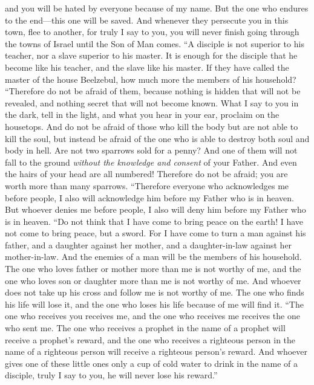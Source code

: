 \begin{biblechapter}
\verse and you will be hated by everyone because of my name. But the one who endures to the end—this one will be saved.
\verse And whenever they persecute you in this town, flee to another, for truly I say to you, you will never finish going through the towns of Israel until the Son of Man comes.
\verse “A disciple is not superior to his teacher, nor a slave superior to his master.
\verse It is enough for the disciple that he become like his teacher, and the slave like his master. If they have called the master of the house Beelzebul, how much more the members of his household?
 “Therefore do not be afraid of them, because nothing is hidden that will not be revealed, and nothing secret that will not become known.
\verse What I say to you in the dark, tell in the light, and what you hear in your ear, proclaim on the housetops.
\verse And do not be afraid of those who kill the body but are not able to kill the soul, but instead be afraid of the one who is able to destroy both soul and body in hell.
\verse Are not two sparrows sold for a penny? And one of them will not fall to the ground \textit{without the knowledge and consent} of your Father.
\verse And even the hairs of your head are all numbered!
\verse Therefore do not be afraid; you are worth more than many sparrows.
\verse “Therefore everyone who acknowledges me before people, I also will acknowledge him before my Father who is in heaven.
\verse But whoever denies me before people, I also will deny him before my Father who is in heaven.
 “Do not think that I have come to bring peace on the earth! I have not come to bring peace, but a sword.
\verse For I have come to turn a man against his father, and a daughter against her mother, and a daughter-in-law against her mother-in-law.
\verse And the enemies of a man will be the members of his household.
\verse The one who loves father or mother more than me is not worthy of me, and the one who loves son or daughter more than me is not worthy of me.
\verse And whoever does not take up his cross and follow me is not worthy of me.
\verse The one who finds his life will lose it, and the one who loses his life because of me will find it.
 “The one who receives you receives me, and the one who receives me receives the one who sent me.
\verse The one who receives a prophet in the name of a prophet will receive a prophet’s reward, and the one who receives a righteous person in the name of a righteous person will receive a righteous person’s reward.
\verse And whoever gives one of these little ones only a cup of cold water to drink in the name of a disciple, truly I say to you, he will never lose his reward.”
\end{biblechapter}

